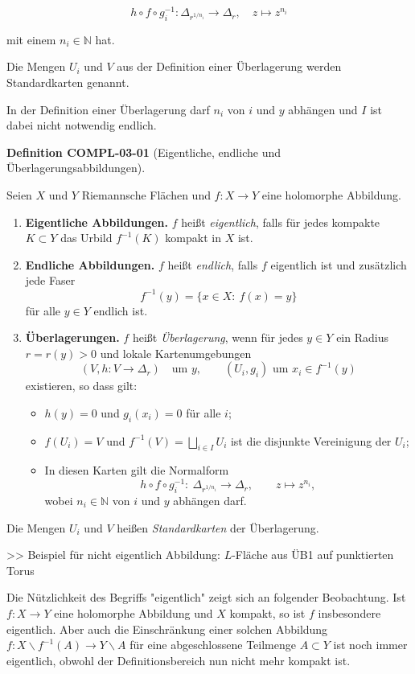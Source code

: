 \documentclass[10pt, letterpaper]{article}
\newcommand{\CustomHeading}[3]{%
  \par\medskip\noindent%
  \textbf{#1 #2} \textnormal{(#3)}.\enskip%
}
\newenvironment{DEF}[2]{\begin{unitbox}\CustomHeading{Definition}{#1}{#2}}{\end{unitbox}}
\begin{document}
$$
h \circ f \circ g_{i}^{-1}: \Delta_{r^{1 / n_{i}}} \rightarrow \Delta_{r}, \quad z \mapsto z^{n_{i}}
$$

mit einem $n_{i} \in \mathbb{N}$ hat.

Die Mengen $U_{i}$ und $V$ aus der Definition einer Überlagerung werden Standardkarten genannt.

In der Definition einer Überlagerung darf $n_{i}$ von $i$ und $y$ abhängen und $I$ ist dabei nicht notwendig endlich.


\begin{DEF}{COMPL-03-01}{Eigentliche, endliche und Überlagerungsabbildungen}
Seien $X$ und $Y$ Riemannsche Flächen und $f:X\to Y$ eine holomorphe Abbildung.
\begin{enumerate}\itemsep0.3em

\item \textbf{Eigentliche Abbildungen.}  
$f$ heißt \emph{eigentlich}, falls für jedes kompakte $K\subset Y$ das Urbild $f^{-1}(K)$ kompakt in $X$ ist.

\item \textbf{Endliche Abbildungen.}  
$f$ heißt \emph{endlich}, falls $f$ eigentlich ist und zusätzlich jede Faser
\[
f^{-1}(y)=\{x\in X:\ f(x)=y\}
\]
für alle $y\in Y$ endlich ist.

\item \textbf{Überlagerungen.}  
$f$ heißt \emph{Überlagerung}, wenn für jedes $y\in Y$ ein Radius $r=r(y)>0$ und lokale Kartenumgebungen
\[
(V,h:V\to\Delta_r)\quad\text{um }y,\qquad (U_i,g_i)\text{ um }x_i\in f^{-1}(y)
\]
existieren, so dass gilt:
\begin{itemize}
  \item $h(y)=0$ und $g_i(x_i)=0$ für alle $i$;
  \item $f(U_i)=V$ und $f^{-1}(V)=\bigsqcup_{i\in I}U_i$ ist die disjunkte Vereinigung der $U_i$;
  \item In diesen Karten gilt die Normalform
  \[
  h\circ f\circ g_i^{-1}:\ \Delta_{r^{1/n_i}}\to \Delta_r,\qquad z\mapsto z^{n_i},
  \]
  wobei $n_i\in\mathbb{N}$ von $i$ und $y$ abhängen darf.
\end{itemize}

\end{enumerate}
Die Mengen $U_i$ und $V$ heißen \emph{Standardkarten} der Überlagerung.
\end{DEF}


>> Beispiel für nicht eigentlich Abbildung: $L$-Fläche aus ÜB1 auf punktierten Torus


Die Nützlichkeit des Begriffs "eigentlich" zeigt sich an folgender Beobachtung. Ist $f: X \rightarrow Y$ eine holomorphe Abbildung und $X$ kompakt, so ist $f$ insbesondere eigentlich. Aber auch die Einschränkung einer solchen Abbildung $f: X \backslash f^{-1}(A) \rightarrow Y \backslash A$ für eine abgeschlossene Teilmenge $A \subset Y$ ist noch immer eigentlich, obwohl der Definitionsbereich nun nicht mehr kompakt ist.
\end{document}
